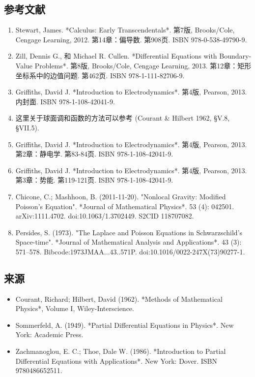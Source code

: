 \subsection{参考文献}  
\begin{enumerate}
\item Stewart, James. *Calculus: Early Transcendentals*. 第7版, Brooks/Cole, Cengage Learning, 2012. 第14章：偏导数. 第908页. ISBN 978-0-538-49790-9.  
\item Zill, Dennis G., 和 Michael R. Cullen. *Differential Equations with Boundary-Value Problems*. 第8版, Brooks/Cole, Cengage Learning, 2013. 第12章：矩形坐标系中的边值问题. 第462页. ISBN 978-1-111-82706-9.  
\item Griffiths, David J. *Introduction to Electrodynamics*. 第4版, Pearson, 2013. 内封面. ISBN 978-1-108-42041-9.  
\item 这里关于球面调和函数的方法可以参考 (Courant & Hilbert 1962, §V.8, §VII.5).  
\item Griffiths, David J. *Introduction to Electrodynamics*. 第4版, Pearson, 2013. 第2章：静电学. 第83-84页. ISBN 978-1-108-42041-9.  
\item Griffiths, David J. *Introduction to Electrodynamics*. 第4版, Pearson, 2013. 第3章：势能. 第119-121页. ISBN 978-1-108-42041-9.  
\item Chicone, C.; Mashhoon, B. (2011-11-20). "Nonlocal Gravity: Modified Poisson's Equation". *Journal of Mathematical Physics*. 53 (4): 042501. arXiv:1111.4702. doi:10.1063/1.3702449. S2CID 118707082.  
\item Persides, S. (1973). "The Laplace and Poisson Equations in Schwarzschild's Space-time". *Journal of Mathematical Analysis and Applications*. 43 (3): 571–578. Bibcode:1973JMAA...43..571P. doi:10.1016/0022-247X(73)90277-1.
\end{enumerate}
\subsection{来源}  
\begin{itemize}
\item Courant, Richard; Hilbert, David (1962). *Methods of Mathematical Physics*, Volume I, Wiley-Interscience.  
\item Sommerfeld, A. (1949). *Partial Differential Equations in Physics*. New York: Academic Press.  
\item Zachmanoglou, E. C.; Thoe, Dale W. (1986). *Introduction to Partial Differential Equations with Applications*. New York: Dover. ISBN 9780486652511.  
\end{itemize}
